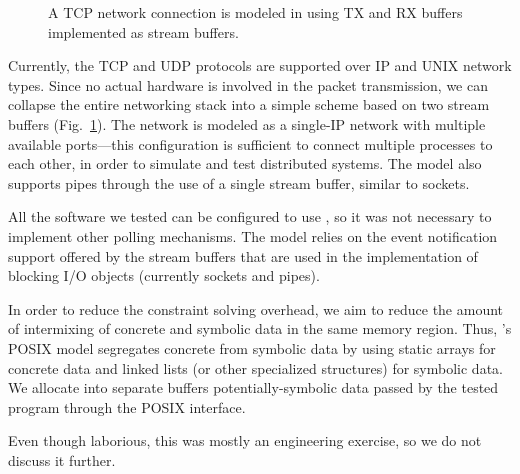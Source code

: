 \begin{figure}[h!]
  \centering
  \caption{A TCP network connection is modeled in \cnine using TX and RX buffers implemented as stream buffers.}
  \label{fig:networkmodel}
\end{figure}

  Currently, the TCP and UDP protocols are supported over IP and UNIX network types. Since no actual hardware is involved in the packet transmission, we can collapse the entire networking stack into a simple scheme based on two stream buffers (Fig.~\ref{fig:networkmodel}). The network is modeled as a single-IP network with multiple available ports---this configuration is sufficient to connect multiple processes to each other, in order to simulate and test distributed systems. The model also supports pipes through the use of a single stream buffer, similar to sockets.

  All the software we tested can be configured to use , so it was not necessary to implement other polling mechanisms.  The  model relies on the event notification support offered by the stream buffers that are used in the implementation of blocking I/O objects (currently sockets and pipes).

  In order to reduce the constraint solving overhead, we aim to reduce the amount of intermixing of concrete and symbolic data in the same memory region.  Thus,  \cnine's POSIX model segregates concrete from symbolic data by using static arrays for concrete data and linked lists (or other specialized structures) for symbolic data.  We allocate into separate buffers potentially-symbolic data passed by the tested program through the POSIX interface.

  Even though laborious, this was mostly an engineering exercise, so we do not discuss it further.



